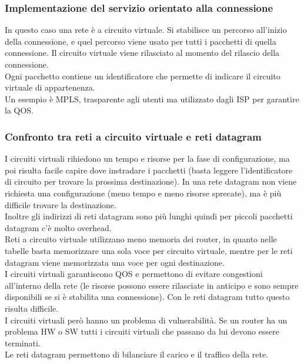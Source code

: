 \documentclass{article}
\begin{document}
\subsubsection{Implementazione del servizio orientato alla connessione}
In questo caso una rete è a circuito virtuale. Si stabilisce un percorso all'inizio della connessione, e quel percorso viene usato per tutti i pacchetti di quella connessione. Il circuito virtuale viene rilasciato al momento del rilascio della connessione. \\
Ogni pacchetto contiene un identificatore che permette di indicare il circuito virtuale di appartenenza.\\
Un esempio è MPLS, trasparente agli utenti ma utilizzato dagli ISP per garantire la QOS.
\subsubsection{Confronto tra reti a circuito virtuale e reti datagram}
I circuiti virtuali rihiedono un tempo e risorse per la fase di configurazione, ma poi risulta facile capire dove instradare i pacchetti (basta leggere l'identificatore di circuito per trovare la prossima destinazione). In una rete datagram non viene richiesta una configurazione (meno tempo e meno risorse sprecate), ma è più difficile trovare la destinazione.\\
Inoltre gli indirizzi di reti datagram sono più lunghi quindi per piccoli pacchetti datagram c'è molto overhead. \\
Reti a circuito virtuale utilizzano meno memoria dei router, in quanto nelle tabelle basta memorizzare una sola voce per circuito virtuale, mentre per le reti datagram viene memorizzata una voce per ogni destinazione. \\
I circuiti virtuali garantiscono QOS e permettono di evitare congestioni all'interno della rete (le risorse possono essere rilasciate in anticipo e sono sempre disponibili se si è stabilita una connessione). Con le reti datagram tutto questo risulta difficile.\\
I circuiti virtuali però hanno un problema di vulnerabilità. Se un router ha un problema HW o SW tutti i circuiti virtuali che passano da lui devono essere terminati. \\
Le reti datagram permettono di bilanciare il carico e il traffico della rete.\\
\end{document}
